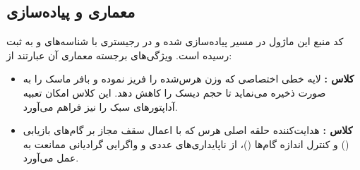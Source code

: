 \subsection{معماری و پیاده‌سازی}
کد منبع این ماژول در مسیر  پیاده‌سازی شده و در رجیستری با شناسه‌های  و  به ثبت رسیده است. ویژگی‌های برجسته معماری آن عبارتند از:
\begin{itemize}
    \item \textbf{کلاس :} لایه خطی اختصاصی که وزن هرس‌شده را فریز نموده و بافر ماسک را به صورت  ذخیره می‌نماید تا حجم دیسک را کاهش دهد. این کلاس امکان تعبیه آداپتورهای سبک  را نیز فراهم می‌آورد.
    \item \textbf{کلاس :} هدایت‌کننده حلقه اصلی هرس که با اعمال سقف مجاز بر گام‌های بازیابی () و کنترل اندازه گام‌ها ()، از ناپایداری‌های عددی و واگرایی گرادیانی ممانعت به عمل می‌آورد.
\end{itemize}
